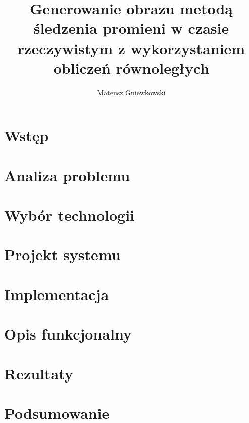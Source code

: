 \documentclass[eng,pl,printmode,openany]{mgr}
\title{Generowanie obrazu metodą śledzenia promieni w czasie rzeczywistym z wykorzystaniem obliczeń równoległych}
\author{Mateusz Gniewkowski}
\begin{document}
\maketitle


\tableofcontents

%

\chapter{Wstęp}


\chapter{Analiza problemu}


\chapter{Wybór technologii}


\chapter{Projekt systemu}


\chapter{Implementacja}


\chapter{Opis funkcjonalny}


\chapter{Rezultaty}


\chapter{Podsumowanie}

\end{document}
